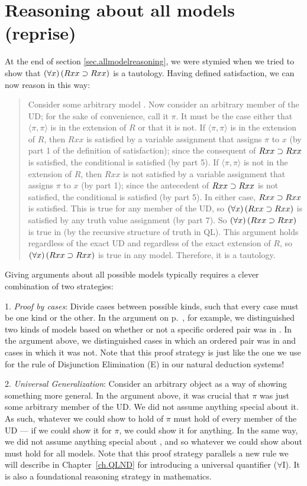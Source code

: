 \section{Reasoning about all models (reprise)}
At the end of section \ref{sec.allmodelreasoning}, we were stymied when we tried to show that $(\forall x) \,(Rxx\supset Rxx)$ is a tautology. Having defined satisfaction, we can now reason in this way:
\begin{quote}
Consider some arbitrary model . Now consider an arbitrary member of the UD; for the sake of convenience, call it $\pi$. It must be the case either that $\langle\pi,\pi\rangle$ is in the extension of $R$ or that it is not. If $\langle\pi,\pi\rangle$ is in the extension of $R$, then $Rxx$ is satisfied by a variable assignment that assigns $\pi$ to $x$ (by part 1 of the definition of  {satisfaction}); since the consequent of $Rxx\supset Rxx$ is satisfied, the conditional is satisfied (by part 5). If $\langle\pi,\pi\rangle$ is not in the extension of $R$, then $Rxx$ is not satisfied by a variable assignment that assigns $\pi$ to $x$ (by part 1); since the antecedent of $Rxx\supset Rxx$ is not satisfied, the conditional is satisfied (by part 5). In either case, $Rxx\supset Rxx$ is satisfied. This is true for any member of the UD, so $(\forall x) \,(Rxx \supset Rxx)$ is satisfied by any truth value assignment (by part 7). So $(\forall x) \,(Rxx \supset Rxx)$ is true in  (by the recursive structure of truth in QL). This argument holds regardless of the exact UD and regardless of the exact extension of $R$, so $(\forall x) \,(Rxx \supset Rxx)$ is true in any model. Therefore, it is a tautology.
\end{quote}

Giving arguments about all possible models typically requires a clever combination of two strategies:

1. {\color{black}\textit{Proof by cases}}: Divide cases between possible kinds, such that every case must be one kind or the other.  In the argument on p.~\pageref{allmodels1}, for example, we distinguished two kinds of models based on whether or not a specific ordered pair was in . In the argument above, we distinguished cases in which an ordered pair was in  and cases in which it was not. {\color{black}Note that this proof strategy is just like the one we use for the rule of Disjunction Elimination (\eor E) in our natural deduction systems!}

2. {\color{black}\textit{Universal Generalization}}: Consider an arbitrary object as a way of showing something more general. In the argument above, it was crucial that $\pi$ was just some arbitrary member of the UD. We did not assume anything special about it. As such, whatever we could show to hold of $\pi$ must hold of every member of the UD --- if we could show it for $\pi$, we could show it for anything. In the same way, we did not assume anything special about , and so whatever we could show about  must hold for all models. {\color{black}Note that this proof strategy parallels a new rule we will describe in Chapter~\ref{ch.QLND} for introducing a universal quantifier ($\forall$I). It is also a foundational reasoning strategy in mathematics.}

